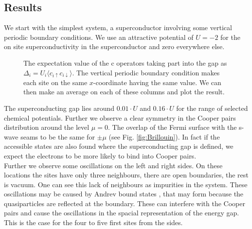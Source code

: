 \documentclass[..\main.tex]{subfile}
\begin{document}
\subsection{Results}
We start with the simplest system, a superconductor involving some vertical periodic boundary conditions.
We use an attractive potential of $U=-2$ for the on site superconductivity in the superconductor and zero everywhere else.
\begin{figure}[H]
  \centering
  
  \caption{The expectation value of the c operators taking part into the gap as $\Delta_i = U_i\langle c_{i\uparrow}c_{i\downarrow}\rangle$. The  
  vertical periodic boundary condition makes each site on the same $x$-coordinate having the same value.
    We can then make an average on each of these columns and plot the result.}
\end{figure}
The superconducting gap lies around $0.01\cdot U$ and $0.16\cdot U$  for the range of selected chemical potentials. Further we observe a 
clear symmetry in the Cooper pairs distribution around the level $\mu =0$. The overlap of the Fermi surface with the s-wave seams
to be the same for $\pm\mu$ (see Fig. \ref{fig:Brillouin}). In fact if the accessible states are also found where the superconducting gap 
is defined, we expect the electrons to be more likely to bind into Cooper pairs.\\   
Further we observe some oscillations on the left and right sides. On these locations the sites have only three
neighbours, there are open boundaries, the rest is vacuum. One can see this lack of neighbours as impurities in the system. 
These oscillations may be caused by Andrev bound states \cite{Bobkov_2024}, that may form because the quasiparticles are reflected at the boundary.
These can interfere with the Cooper pairs and cause the oscillations in the spacial representation of the energy gap. This is the case for the four to 
five first sites from the sides.\\
\end{document}
